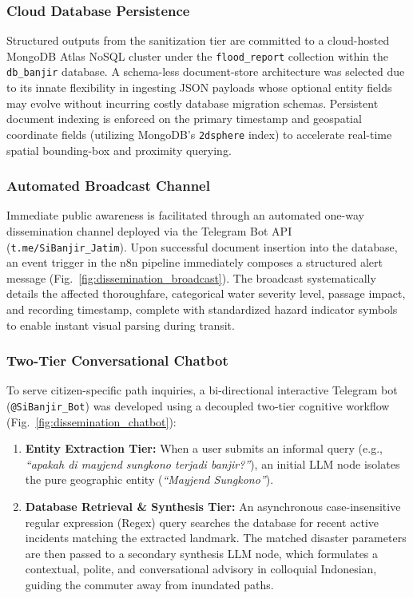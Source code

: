 \documentclass[conference]{IEEEtran}
\begin{document}
\subsubsection{Cloud Database Persistence}
Structured outputs from the sanitization tier are committed to a cloud-hosted MongoDB Atlas NoSQL cluster under the \texttt{flood\_report} collection within the \texttt{db\_banjir} database. A schema-less document-store architecture was selected due to its innate flexibility in ingesting JSON payloads whose optional entity fields may evolve without incurring costly database migration schemas. Persistent document indexing is enforced on the primary timestamp and geospatial coordinate fields (utilizing MongoDB's \texttt{2dsphere} index) to accelerate real-time spatial bounding-box and proximity querying.

\subsubsection{Automated Broadcast Channel}
Immediate public awareness is facilitated through an automated one-way dissemination channel deployed via the Telegram Bot API (\texttt{t.me/SiBanjir\_Jatim}). Upon successful document insertion into the database, an event trigger in the n8n pipeline immediately composes a structured alert message (Fig.~\ref{fig:dissemination_broadcast}). The broadcast systematically details the affected thoroughfare, categorical water severity level, passage impact, and recording timestamp, complete with standardized hazard indicator symbols to enable instant visual parsing during transit.

\subsubsection{Two-Tier Conversational Chatbot}
To serve citizen-specific path inquiries, a bi-directional interactive Telegram bot (\texttt{@SiBanjir\_Bot}) was developed using a decoupled two-tier cognitive workflow (Fig.~\ref{fig:dissemination_chatbot}):
\begin{enumerate}
    \item \textbf{Entity Extraction Tier:} When a user submits an informal query (e.g., \textit{``apakah di mayjend sungkono terjadi banjir?''}), an initial LLM node isolates the pure geographic entity (\textit{``Mayjend Sungkono''}).
    \item \textbf{Database Retrieval \& Synthesis Tier:} An asynchronous case-insensitive regular expression (Regex) query searches the database for recent active incidents matching the extracted landmark. The matched disaster parameters are then passed to a secondary synthesis LLM node, which formulates a contextual, polite, and conversational advisory in colloquial Indonesian, guiding the commuter away from inundated paths.
\end{enumerate}
\end{document}
